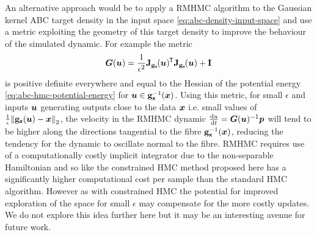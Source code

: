 An alternative approach would be to apply a \ac{RMHMC} algorithm to the Gaussian kernel \ac{ABC} target density in the input space \eqref{eq:abc-density-input-space} and use a metric exploiting the geometry of this target density to improve the behaviour of the simulated dynamic. For example the metric
\begin{equation}\label{eq:rmhmc-abc-metric}
  \mtx{G}(\vct{u}) = \frac{1}{\epsilon^2}\jacob{\genfunc_{\rvct{x}}}{\vct{u}}\phantom{}\tr\jacob{\genfunc_{\rvct{x}}}{\vct{u}} + \idmtx
\end{equation}  
is positive definite everywhere and equal to the Hessian of the potential energy \eqref{eq:abc-hmc-potential-energy} for $\boldsymbol{u} \in {\mathbf{g}}_{\boldsymbol{\mathsf{x}}}^{-1}(\boldsymbol{x})$. Using this metric, for small $\epsilon$ and inputs $\boldsymbol{u}$ generating outputs close to the data $\boldsymbol{x}$ i.e. small values of $\frac{1}{\epsilon}\left\Vert\genfunc_{\rvct{x}}(\vct{u}) - \vct{x}\right\Vert_2$, the velocity in the \ac{RMHMC} dynamic $\frac{\mathrm{d} u}{\mathrm{d} t} = \boldsymbol{G}(\boldsymbol{u})^{-1}\boldsymbol{p}$ will tend to be higher along the directions tangential to the fibre ${\mathbf{g}}_{\boldsymbol{\mathsf{x}}}^{-1}(\boldsymbol{x})$, reducing the tendency for the dynamic to oscillate normal to the fibre. \ac{RMHMC} requires use of a computationally costly implicit integrator due to the non-separable Hamiltonian and so like the constrained \ac{HMC} method proposed here has a significantly higher computational cost per sample than the standard \ac{HMC} algorithm.  However as with constrained \ac{HMC} the potential for improved exploration of the space for small $\epsilon$ may compensate for the more costly updates. We do not explore this idea further here but it may be an interesting avenue for future work.



